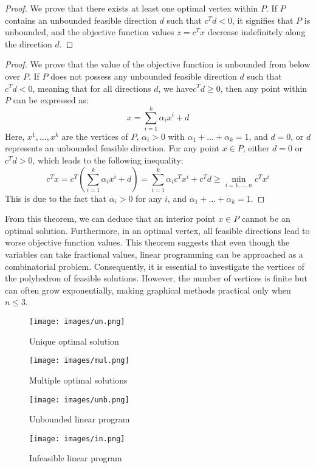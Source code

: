 \begin{proof}
    We prove that there exists at least one optimal vertex within $P$.
    If $P$ contains an unbounded feasible direction $d$ such that $c^Td < 0$, it signifies that $P$ is unbounded, and the objective function values $z=c^Tx$ decrease indefinitely along the direction $d$. 
\end{proof}
\begin{proof}
    We prove that the  value of the objective function is unbounded from below over $P$.
    If $P$ does not possess any unbounded feasible direction $d$ such that $c^Td < 0$, meaning that for all directions $d$, we have$c^Td \geq 0$, then any point within $P$ can be expressed as: 
    \[x=\sum_{i=1}^k{\alpha_ix^i + d}\]
    Here, $x^1,\dots,x^k$ are the vertices of $P$, $\alpha_i > 0$ with $\alpha_1+\dots+\alpha_k=1$, and $d = 0$, or $d$ represents an unbounded feasible direction.
    For any point $x \in P$, either $d = 0$ or $c^Td > 0$, which leads to the following inequality:
    \[c^Tx=c^T\left(\sum_{i=1}^{k}{\alpha_ix^i+d}\right)=\sum_{i=1}^{k}{\alpha_ic^Tx^i+c^Td}\geq\min_{i=1,\dots,n}{c^Tx^i}\]
    This is due to the fact that $\alpha_i > 0$ for any $i$, and $\alpha_1+\dots+\alpha_k=1$. 
\end{proof}
From this theorem, we can deduce that an interior point $x \in P$ cannot be an optimal solution. 
Furthermore, in an optimal vertex, all feasible directions lead to worse objective function values.
This theorem suggests that even though the variables can take fractional values, linear programming can be approached as a combinatorial problem.
Consequently, it is essential to investigate the vertices of the polyhedron of feasible solutions.
However, the number of vertices is finite but can often grow exponentially, making graphical methods practical only when $n \leq 3$. 
\begin{figure}[H] 
    \begin{minipage}[b]{0.5\linewidth}
      \centering
      \texttt{[image: images/un.png]} 
      \caption{Unique optimal solution} 
      \vspace{4ex}
    \end{minipage}%
    \begin{minipage}[b]{0.5\linewidth}
      \centering
      \texttt{[image: images/mul.png]} 
      \caption{Multiple optimal solutions} 
      \vspace{4ex}
    \end{minipage} 
    \begin{minipage}[b]{0.5\linewidth}
      \centering
      \texttt{[image: images/unb.png]} 
      \caption{Unbounded linear program} 
      \vspace{4ex}
    \end{minipage}%
    \begin{minipage}[b]{0.5\linewidth}
      \centering
      \texttt{[image: images/in.png]} 
      \caption{Infeasible linear program} 
      \vspace{4ex}
    \end{minipage} 
\end{figure}